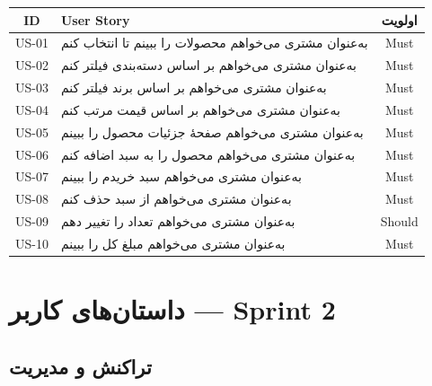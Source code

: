 \documentclass[12pt, a4paper]{article}
\begin{document}
\begin{center}
\begin{tabular}{|c|p{9cm}|c|}
\hline
\textbf{ID} & \textbf{User Story} & \textbf{اولویت} \\
\hline
US-01 & به‌عنوان مشتری می‌خواهم محصولات را ببینم تا انتخاب کنم & Must \\
\hline
US-02 & به‌عنوان مشتری می‌خواهم بر اساس دسته‌بندی فیلتر کنم & Must \\
\hline
US-03 & به‌عنوان مشتری می‌خواهم بر اساس برند فیلتر کنم & Must \\
\hline
US-04 & به‌عنوان مشتری می‌خواهم بر اساس قیمت مرتب کنم & Must \\
\hline
US-05 & به‌عنوان مشتری می‌خواهم صفحهٔ جزئیات محصول را ببینم & Must \\
\hline
US-06 & به‌عنوان مشتری می‌خواهم محصول را به سبد اضافه کنم & Must \\
\hline
US-07 & به‌عنوان مشتری می‌خواهم سبد خریدم را ببینم & Must \\
\hline
US-08 & به‌عنوان مشتری می‌خواهم از سبد حذف کنم & Must \\
\hline
US-09 & به‌عنوان مشتری می‌خواهم تعداد را تغییر دهم & Should \\
\hline
US-10 & به‌عنوان مشتری می‌خواهم مبلغ کل را ببینم & Must \\
\hline
\end{tabular}
\end{center}

\section{داستان‌های کاربر — Sprint 2}

\subsection{تراکنش و مدیریت}
\end{document}
